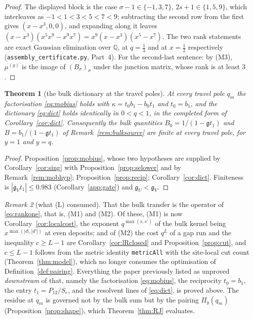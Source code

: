 \documentclass[11pt]{article}
\theoremstyle{plain}
\newtheorem{theorem}{Theorem}
\theoremstyle{definition}
\theoremstyle{remark}
\newtheorem{remark}[theorem]{Remark}
\newcommand{\Q}{\mathbb{Q}}
\begin{document}
\begin{proof}
The displayed block is the case $\sigma-1\in\{-1,3,7\}$, $2s+1\in\{1,5,9\}$, which interleaves as
$-1<1<3<5<7<9$; subtracting the second row from the first gives $(x-x^3,0,0)$, and expanding along
it leaves $(x-x^3)(x^5x^9-x^9x^7)=x^9(x-x^3)(x^5-x^7)$. The two rank statements are exact Gaussian
elimination over $\Q$, at $q=\tfrac13$ and at $x=\tfrac12$ respectively
(\texttt{assembly\_certificate.py}, Part~4). For the second-last sentence: by \textup{(M3)}, $\mu^{(y)}$
is the image of $(B_\sigma)_\sigma$ under the junction matrix, whose rank is at least $3$.
\end{proof}

\begin{theorem}[the bulk dictionary at the travel poles]\label{thm:L}
At every travel pole $q_m$ the factorisation \eqref{eq:mobius} holds with
$\kappa=t_0b_1-b_0t_1$ and $t_0=b_1$, and the dictionary \eqref{eq:dict} holds identically in
$0<q<1$, in the completed form of Corollary~\ref{cor:dict}. Consequently the bulk quantities
$B_0=1/(1-\mathfrak gt_1)$ and $B=b_1/(1-\mathfrak gt_1)$ of Remark~\ref{rem:bulksource} are finite at
every travel pole, for $y=1$ and $y=q$.
\end{theorem}

\begin{proof}
Proposition~\ref{prop:mobius}, whose two hypotheses are supplied by Corollary~\ref{cor:sing} with
Proposition~\ref{prop:selower} and by Remark~\ref{rem:mobhyp}; Proposition~\ref{prop:recip};
Corollary~\ref{cor:dict}. Finiteness is $|\mathfrak g_Vt_1|\le0.983$ (Corollary~\ref{app:gate}) and
$\mathfrak g_U<\mathfrak g_V$.
\end{proof}

\begin{remark}[what \textup{(L)} consumed]\label{rem:Lgap}
That the bulk transfer is the operator of \eqref{eq:rankone}, that is, \textup{(M1)} and
\textup{(M2)}. Of these, \textup{(M1)} is now Corollary~\ref{cor:localcost}, the exponent
$q^{\max(s,s')}$ of the bulk kernel being $x^{\max(|d|,|d'|)}$ at even deposits; and of
\textup{(M2)} the cost $q^L$ of a gap run and the inequality $c\ge L-1$ are
Corollary~\ref{cor:lRclosed} and Proposition~\ref{prop:cut}, and $c\le L-1$ follows from the metric
identity \texttt{metricAll} with the site-local cut count (Theorem~\ref{thm:model}), which no
longer consumes the optimisation of Definition~\ref{def:pairing}. Everything the paper previously listed as
unproved \emph{downstream} of that, namely the factorisation \eqref{eq:mobius}, the reciprocity
$t_0=b_1$, the entry $t_1=P_{12}/S_e$, and the resolvent lines of \eqref{eq:dict}, is proved above.
The residue at $q_m$ is governed not by the bulk sum but by the pairing $\Pi_y(q_m)$
(Proposition~\ref{prop:shape}), which Theorem~\ref{thm:RJ} evaluates.
\end{remark}
\end{document}
